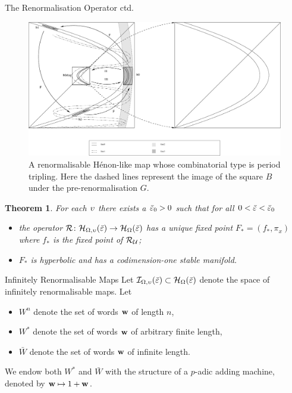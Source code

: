 \documentclass[final,hyperref={pdfpagelabels=false}]{beamer}
\theoremstyle{plain}%
\newtheorem{thm}{Theorem}
\theoremstyle{definition}
\theoremstyle{remark}
\begin{document}
\begin{frame}{}
\begin{columns}[t]
\begin{column}{0.3\linewidth}
\begin{block}{The Renormalisation Operator ctd.}
\begin{figure}[htp]
\includegraphics[scale=0.65]{period3-henon-5.eps}
\vspace*{0.1cm}
\caption{A renormalisable H\'enon-like map whose combinatorial type is period tripling. Here the dashed lines represent the image of the square $B$ under the pre-renormalisation $G$.}\label{fig:renorm-henon}
\end{figure}
\begin{thm}\label{R-convergence}
For each $\upsilon$ there exists a $\bar{\varepsilon}_0>0$ such that for all $0<\bar{\varepsilon}<\bar{\varepsilon}_0$ 
\begin{itemize}
\item the operator
$\mathcal{R}\colon \mathcal H_{\Omega,\upsilon}(\bar{\varepsilon})\to\mathcal H_{\Omega}(\bar{\varepsilon})$
has a unique fixed point $F_*=(f_*,\pi_x)$ where $f_*$ is the fixed point of $\mathcal{R}_\mathcal{U}$;
\item $F_*$ is hyperbolic and has a codimension-one stable manifold.
\end{itemize}
\end{thm}
\end{block}


\begin{block}{Infinitely Renormalisable Maps}
Let $\mathcal I_{\Omega,\upsilon}(\bar{\varepsilon})\subset \mathcal H_{\Omega}(\bar{\varepsilon})$ denote the space of infinitely renormalisable maps.
Let  
\begin{itemize}
\item $W^n$ denote the set of words $\mathbf{w}$ of length $n$, 
\item $W^*$ denote the set of words $\mathbf{w}$ of arbitrary finite length,
\item $\bar W$ denote the set of words $\mathbf{w}$ of infinite length.
\end{itemize}
We endow both $W^*$ and $\bar W$ with the structure of a $p$-adic adding machine, denoted by $\mathbf{w}\mapsto 1+\mathbf{w}$.

\begin{figure}[tp]
\centering
\tiny
{}


\end{figure}
\end{block}
\end{column}
\end{columns}
\end{frame}
\end{document}

